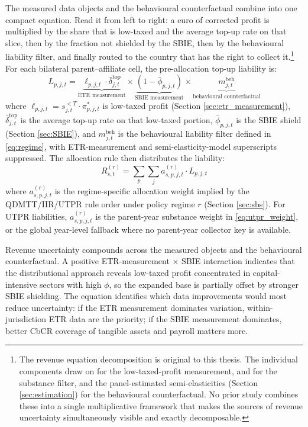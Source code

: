\documentclass[11pt,a4paper]{article}
\begin{document}
The measured data objects and the behavioural counterfactual combine into one compact equation. Read it from left to right: a euro of corrected profit is multiplied by the share that is low-taxed and the average top-up rate on that slice, then by the fraction not shielded by the SBIE, then by the behavioural liability filter, and finally routed to the country that has the right to collect it.\footnote{The revenue equation decomposition is original to this thesis. The individual components draw on \citet{hugger2026} for the low-taxed-profit measurement, \citet{schjelderup2024} and \citet{devereux2023} for the substance filter, and the panel-estimated semi-elasticities (Section \ref{sec:estimation}) for the behavioural counterfactual. No prior study combines these into a single multiplicative framework that makes the sources of revenue uncertainty simultaneously visible and exactly decomposable.} For each bilateral parent--affiliate cell, the pre-allocation top-up liability is:
\begin{equation}\label{eq:pipeline}
L_{p,j,t} = \underbrace{\ell_{p,j,t} \cdot \bar{\delta}_{j,t}^{\text{top}}}_{\text{ETR measurement}} \times \underbrace{\left(1 - \bar{\phi}_{p,j,t}\right)}_{\text{SBIE measurement}} \times \underbrace{m_{j,t}^{\text{beh}}}_{\text{behavioural counterfactual}}
\end{equation}
where $\ell_{p,j,t} = s_{j,t}^{<T} \cdot \pi_{p,j,t}^{*}$ is low-taxed profit (Section \ref{sec:etr_measurement}), $\bar{\delta}_{j,t}^{\text{top}}$ is the average top-up rate on that low-taxed portion, $\bar{\phi}_{p,j,t}$ is the SBIE shield (Section \ref{sec:SBIE}), and $m_{j,t}^{\text{beh}}$ is the behavioural liability filter defined in \eqref{eq:regime}, with ETR-measurement and semi-elasticity-model superscripts suppressed. The allocation rule then distributes the liability:
\begin{equation}\label{eq:allocation}
R_{s,t}^{(r)} = \sum_p \sum_j a_{s,p,j,t}^{(r)} \cdot L_{p,j,t}
\end{equation}
where $a_{s,p,j,t}^{(r)}$ is the regime-specific allocation weight implied by the QDMTT/IIR/UTPR rule order under policy regime $r$ (Section \ref{sec:sbs}). For UTPR liabilities, $a_{s,p,j,t}^{(r)}$ is the parent-year substance weight in \eqref{eq:utpr_weight}, or the global year-level fallback where no parent-year collector key is available.

Revenue uncertainty compounds across the measured objects and the behavioural counterfactual. A positive ETR-measurement $\times$ SBIE interaction indicates that the distributional approach reveals low-taxed profit concentrated in capital-intensive sectors with high $\phi$, so the expanded base is partially offset by stronger SBIE shielding. The equation identifies which data improvements would most reduce uncertainty: if the ETR measurement dominates variation, within-jurisdiction ETR data are the priority; if the SBIE measurement dominates, better CbCR coverage of tangible assets and payroll matters more.
\end{document}
